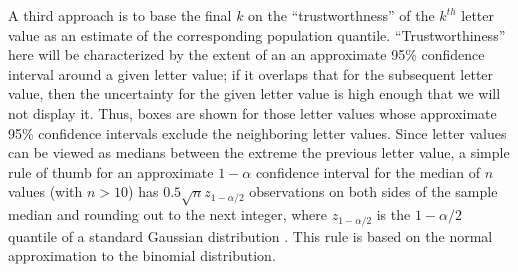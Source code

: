 \documentclass[11pt]{article}
\begin{document}
% 
% 
% 
% 

A third approach is to base the final $k$ on the ``trustworthness'' 
of the $k^{th}$ letter value as an estimate of the corresponding
population quantile. 
``Trustworthiness'' here will be characterized by the extent of an
an approximate 95\% confidence interval around a given letter value;
if it overlaps that for the subsequent letter value, then the
uncertainty for the given letter value is high enough that we
will not display it.  Thus, boxes are shown for those
letter values whose approximate 95\% confidence intervals
exclude the neighboring letter values. 
Since letter values can be viewed as medians between the
extreme the previous letter value,
a simple rule of thumb for an approximate 
$1-\alpha$ confidence interval for the median of $n$ values 
(with $n > 10$) has $0.5 \sqrt{n} z_{1-\alpha/2}$ observations 
on both sides of the sample median and rounding out to the next integer, 
where $z_{1-\alpha/2}$ is the ${1-\alpha/2}$ quantile of a standard 
Gaussian distribution \citep[p.~161]{ha.order}. 
This rule is based on the normal approximation to the binomial
distribution.
\end{document}
